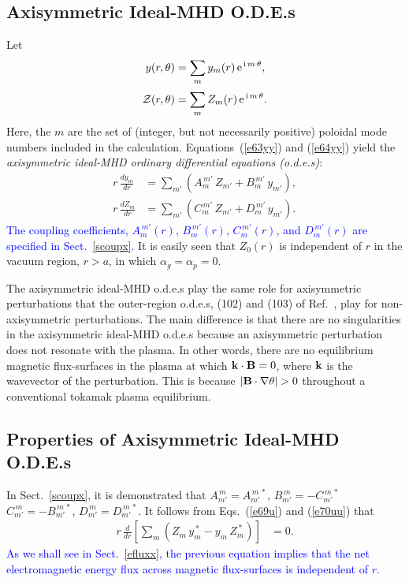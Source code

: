 \documentclass[12pt,prb,aps]{revtex4-1}
\begin{document}
\subsection{Axisymmetric Ideal-MHD O.D.E.s}\label{ode}
Let
\begin{align}\label{e62s}
y(r,\theta)&= \sum_m y_m(r)\,{\rm e}^{\,{\rm i}\,m\,\theta},\\[0.5ex]
{\cal Z}(r,\theta) &= \sum_m Z_m(r)\,{\rm e}^{\,{\rm i}\,m\,\theta}.\label{e63s}
\end{align}
Here, the $m$ are the set of (integer, but not necessarily positive) poloidal mode numbers included in the calculation. 
Equations~(\ref{e63yy}) and (\ref{e64yy}) yield the  {\em axisymmetric ideal-MHD ordinary differential equations (o.d.e.s)}:
\begin{align}\label{e69u}
r\,\frac{dy_m}{dr}&= \sum_{m'}\left(A_{m}^{\,m'}\,Z_{m'} + B_{m}^{\,m'}\,y_{m'}\right),\\[0.5ex]
r\,\frac{dZ_m}{dr}&= \sum_{m'}\left(C_{m}^{\,m'}\,Z_{m'} + D_{m}^{\,m'}\,y_{m'}\right).\label{e70uu}
\end{align}
\textcolor{blue}{The coupling coefficients, $A_m^{\,m'}(r)$, $B_m^{\,m'}(r)$, $C_{m}^{\,m'}(r)$, and $D_m^{\,m'}(r)$ are specified in Sect.~\ref{scoupx}.}
 It is easily seen that $Z_0(r)$ is independent of $r$ in the vacuum region, $r> a$,  in which
$\alpha_g=\alpha_p=0$. 

The axisymmetric ideal-MHD o.d.e.s play the same role for axisymmetric perturbations that the outer-region o.d.e.s, (102) and (103) of Ref.~, play for
non-axisymmetric perturbations. The main difference is that there are no singularities in the axisymmetric ideal-MHD o.d.e.s because an axisymmetric perturbation 
does not resonate with the plasma. In other words, there are no equilibrium magnetic flux-surfaces in the plasma at which ${\bf k}\cdot{\bf B}=0$, where ${\bf k}$ is the
wavevector of the perturbation. This is because $|{\bf B}\cdot\nabla\theta|>0$ throughout a conventional tokamak plasma equilibrium. 

\subsection{Properties of Axisymmetric Ideal-MHD O.D.E.s}
In Sect.~\ref{scoupx}, it is demonstrated that 
$A_{m'}^{\,m} = A_{m'}^{\,m\,\ast}$, 
$B_{m'}^{\,m} = -C_{m'}^{\,m\,\ast}$
$C_{m'}^{\,m} = -B_{m'}^{\,m\,\ast}$, 
$D_{m'}^{\,m} = D_{m'}^{\,m\,\ast}$.
It follows from Eqs.~(\ref{e69u}) and (\ref{e70uu}) that 
\begin{align}\label{cons}
r\,\frac{d}{dr}\!\left[\sum_m (Z_m\,y_m^{\,\ast}- y_m\,Z_m^{\,\ast}) \right]&= 0.
\end{align}
\textcolor{blue}{As we shall see in Sect.~\ref{efluxx}, the previous equation implies that the net electromagnetic energy flux across magnetic flux-surfaces is independent of $r$. }
\end{document}
